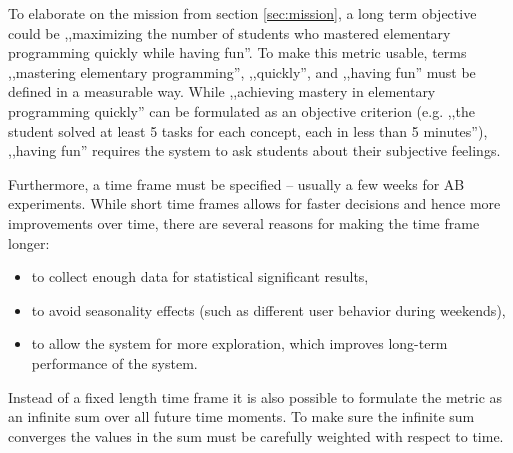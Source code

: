 To elaborate on the mission from section \ref{sec:mission},
  a long term objective could be
  ,,maximizing the number of students
  who mastered elementary programming quickly while having fun''.
To make this metric usable,
  terms ,,mastering elementary programming'', ,,quickly'', and ,,having fun''
  must be defined in a measurable way.
While ,,achieving mastery in elementary programming quickly'' can be
  formulated as an objective criterion
  (e.g. ,,the student solved at least 5 tasks for each concept, each in less than 5 minutes''),
  ,,having fun'' requires the system to ask students about their subjective feelings.

Furthermore, a time frame must be specified
  -- usually a few weeks for AB experiments.
While short time frames allows for faster decisions and hence more improvements over time,
there are several reasons for making the time frame longer:
\begin{itemize}
  \item to collect enough data for statistical significant results,
  \item to avoid seasonality effects (such as different user behavior during weekends),
  \item to allow the system for more exploration, which improves long-term performance of the system.
\end{itemize}

Instead of a fixed length time frame
  it is also possible to formulate the metric as
  an infinite sum over all future time moments.
To make sure the infinite sum converges
  the values in the sum must be carefully weighted with respect to time.




